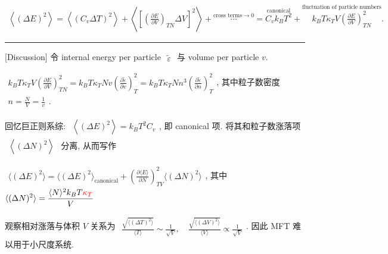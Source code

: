 \documentclass[../../main.tex]{subfiles}
\begin{document}
$\begin{aligned}
    \left\langle (\Delta E)^{2}\right\rangle 
    = \left\langle(C_{v}\Delta T)^{2}\right\rangle + \left\langle\left[\left(\frac{\partial E}{\partial V}\right)_{TN}\Delta V\right]^{2}\right\rangle + \stackrel{\text{cross terms}\rightarrow 0}{\cdots} 
    = \stackrel{\text{canonical}}{C_{v}k_{B}T^{2}} + \stackrel{\text{fluctuation of particle numbers}}{k_{B}T\kappa_{T}V\left(\frac{\partial E}{\partial V}\right)^{2}_{TN}}.
\end{aligned}$

\vspace{0.3em}\hrule\vspace{0.3em}

[Discussion] 令 internal energy per particle $\begin{aligned}
    \widetilde{\varepsilon}
\end{aligned}$ 与 volume per particle $v$. 

$\begin{aligned}
    k_{B}T\kappa_{T}V\left(\frac{\partial E}{\partial V}\right)^{2}_{TN} 
    = k_{B}T\kappa_{T}Nv\left(\frac{\partial \widetilde{\varepsilon}}{\partial v}\right)^{2}_{T} 
    = k_{B}T\kappa_{T}Nn^{3}\left(\frac{\partial \widetilde{\varepsilon}}{\partial n}\right)^{2}_{T}
\end{aligned}$, 其中粒子数密度 $\begin{aligned}
    n = \frac{N}{V} = \frac{1}{v}
\end{aligned}$. 

回忆巨正则系综: $\begin{aligned}
    \left\langle (\Delta E)^{2}\right\rangle = k_{B}T^{2}C_{v}
\end{aligned}$, 即 canonical 项. 将其和粒子数涨落项 $\begin{aligned}
    \left\langle (\Delta N)^{2}\right\rangle
\end{aligned}$ 分离, 从而写作

$\begin{aligned}
    \langle (\Delta E)^{2}\rangle = \langle (\Delta E)^{2}\rangle_{\text{canonical}} + \left(\frac{\partial \langle E\rangle}{\partial N}\right)_{TV}^{2}\langle(\Delta N)^{2}\rangle
\end{aligned}$, 其中 $\begin{aligned}
    \langle(\Delta N)^{2}\rangle = \frac{\langle N\rangle^{2}k_{B}T{\color{red}{\kappa_{T}}}}{V}
\end{aligned}$

观察相对涨落与体积 $V$ 关系为 $\begin{aligned}
    \frac{\sqrt{\langle(\Delta T)^{2}\rangle}}{\langle T\rangle} \sim \frac{1}{\sqrt{V}},\quad \frac{\sqrt{\langle(\Delta V)^{2}\rangle}}{\langle V\rangle}\propto \frac{1}{\sqrt{V}}
\end{aligned}$. 因此 MFT 难以用于小尺度系统. 
\end{document}
